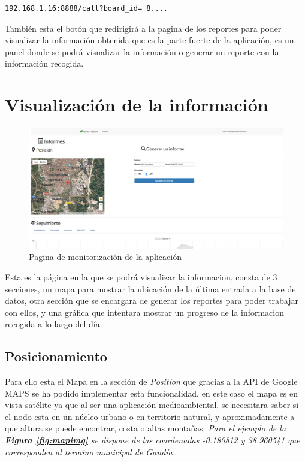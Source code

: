 \begin{lstlisting}[caption=Ejemplo para una ID diferente, label=getstringexaple]
192.168.1.16:8888/call?board_id= 8....
\end{lstlisting}

También esta el botón que redirigirá a la pagina de los reportes para poder visualizar la información obtenida que es la parte fuerte de la aplicación, es un panel donde se podrá visualizar la información o generar un reporte con la información recogida.
\clearpage

\section{Visualización  de la información}

\begin{figure}[!h]
	\centering
	\includegraphics[width=1.0\linewidth]{figuras/nodereport}
	\caption{Pagina de monitorización de la aplicación}
	\label{fig:nodereport}
\end{figure}

Esta es la página en la que se podrá visualizar la informacion, consta de 3 secciones, un mapa para mostrar la ubicación de la última entrada a la base de datos, otra sección que se encargara de generar los reportes para poder trabajar con ellos, y una gráfica que intentara mostrar un progreso de la informacion recogida a lo largo del día.

\subsection{Posicionamiento}

Para ello esta el Mapa en la sección de \textit{Position} que gracias a la API de Google MAPS se ha podido implementar esta funcionalidad, en este caso el mapa es en vista satélite ya que al ser una aplicación medioambiental, se necesitara saber si el nodo esta en un núcleo urbano o en territorio natural, y aproximadamente a que altura se puede encontrar, costa o altas montañas. \textit{Para el ejemplo de la \textbf{Figura \ref{fig:mapimg}} se dispone de las coordenadas -0.180812 y 38.960541 que corresponden al termino municipal de Gandía.} 

